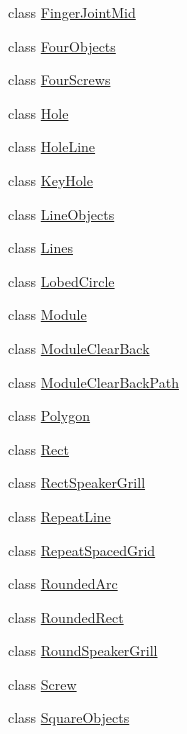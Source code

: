 \begin{DoxyCompactItemize}
\item 
class \hyperlink{classshapes_1_1_finger_joint_mid}{Finger\+Joint\+Mid}
\item 
class \hyperlink{classshapes_1_1_four_objects}{Four\+Objects}
\item 
class \hyperlink{classshapes_1_1_four_screws}{Four\+Screws}
\item 
class \hyperlink{classshapes_1_1_hole}{Hole}
\item 
class \hyperlink{classshapes_1_1_hole_line}{Hole\+Line}
\item 
class \hyperlink{classshapes_1_1_key_hole}{Key\+Hole}
\item 
class \hyperlink{classshapes_1_1_line_objects}{Line\+Objects}
\item 
class \hyperlink{classshapes_1_1_lines}{Lines}
\item 
class \hyperlink{classshapes_1_1_lobed_circle}{Lobed\+Circle}
\item 
class \hyperlink{classshapes_1_1_module}{Module}
\item 
class \hyperlink{classshapes_1_1_module_clear_back}{Module\+Clear\+Back}
\item 
class \hyperlink{classshapes_1_1_module_clear_back_path}{Module\+Clear\+Back\+Path}
\item 
class \hyperlink{classshapes_1_1_polygon}{Polygon}
\item 
class \hyperlink{classshapes_1_1_rect}{Rect}
\item 
class \hyperlink{classshapes_1_1_rect_speaker_grill}{Rect\+Speaker\+Grill}
\item 
class \hyperlink{classshapes_1_1_repeat_line}{Repeat\+Line}
\item 
class \hyperlink{classshapes_1_1_repeat_spaced_grid}{Repeat\+Spaced\+Grid}
\item 
class \hyperlink{classshapes_1_1_rounded_arc}{Rounded\+Arc}
\item 
class \hyperlink{classshapes_1_1_rounded_rect}{Rounded\+Rect}
\item 
class \hyperlink{classshapes_1_1_round_speaker_grill}{Round\+Speaker\+Grill}
\item 
class \hyperlink{classshapes_1_1_screw}{Screw}
\item 
class \hyperlink{classshapes_1_1_square_objects}{Square\+Objects}
\end{DoxyCompactItemize}
